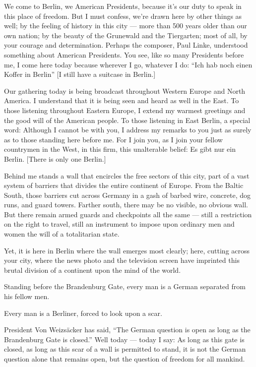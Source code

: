 \documentclass[a4paper]{amsbook}
\begin{document}
We come to Berlin, we American Presidents, because it's our duty to speak in this place of freedom. But I must confess, we're drawn here by other things as well; by the feeling of history in this city — more than 500 years older than our own nation; by the beauty of the Grunewald and the Tiergarten; most of all, by your courage and determination. Perhaps the composer, Paul Linke, understood something about American Presidents. You see, like so many Presidents before me, I come here today because wherever I go, whatever I do: “Ich hab noch einen Koffer in Berlin” [I still have a suitcase in Berlin.]

Our gathering today is being broadcast throughout Western Europe and North America. I understand that it is being seen and heard as well in the East. To those listening throughout Eastern Europe, I extend my warmest greetings and the good will of the American people. To those listening in East Berlin, a special word: Although I cannot be with you, I address my remarks to you just as surely as to those standing here before me. For I join you, as I join your fellow countrymen in the West, in this firm, this unalterable belief: Es gibt nur ein Berlin. [There is only one Berlin.]

Behind me stands a wall that encircles the free sectors of this city, part of a vast system of barriers that divides the entire continent of Europe. From the Baltic South, those barriers cut across Germany in a gash of barbed wire, concrete, dog runs, and guard towers. Farther south, there may be no visible, no obvious wall. But there remain armed guards and checkpoints all the same — still a restriction on the right to travel, still an instrument to impose upon ordinary men and women the will of a totalitarian state.

Yet, it is here in Berlin where the wall emerges most clearly; here, cutting across your city, where the news photo and the television screen have imprinted this brutal division of a continent upon the mind of the world.

Standing before the Brandenburg Gate, every man is a German separated from his fellow men.

Every man is a Berliner, forced to look upon a scar.

President Von Weizsäcker has said, “The German question is open as long as the Brandenburg Gate is closed.” Well today — today I say: As long as this gate is closed, as long as this scar of a wall is permitted to stand, it is not the German question alone that remains open, but the question of freedom for all mankind.
\end{document}
